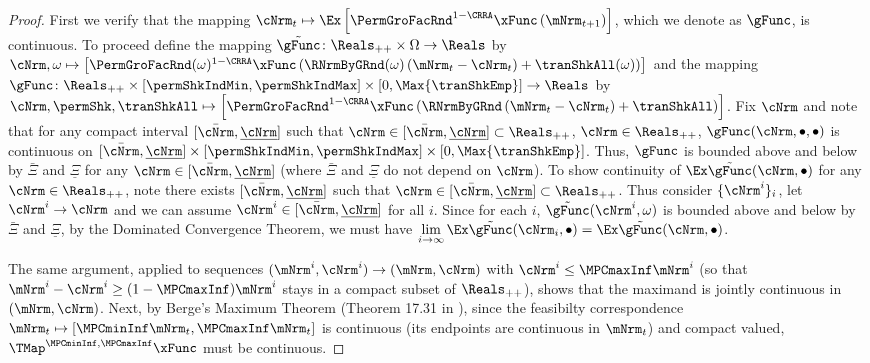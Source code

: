 \documentclass[\econtexRoot/BufferStockTheory]{subfiles}
\begin{document}
\begin{proof}
First we verify that the mapping $\cNrm_{t}\mapsto \Ex\left[ {\PermGroFacRnd}^{1-\CRRA }{\mathfrak{\xFunc}}
                                            \left( {\mNrm}_{t+1}\right) \right]$, which we denote as $\gFunc$,  is continuous.
To proceed define the mapping $\tilde{\gFunc}\colon \Reals_{++}\times\Omega\rightarrow \Reals$ by $\cNrm, \omega \mapsto\left[ {\PermGroFacRnd}(\omega)^{1-\CRRA }{\mathfrak{\xFunc}}
                                            \left( \RNrmByGRnd(\omega)\left(\mNrm_{t} - \cNrm_{t}\right) + \tranShkAll(\omega)\right) \right]$ and the mapping $\gFunc\colon \Reals_{++}\times[\permShkIndMin,\permShkIndMax]\times [0,\Max{\tranShkEmp}] \rightarrow \Reals$ by $\cNrm, \permShk,\tranShkAll \mapsto\left[ {\PermGroFacRnd}^{1-\CRRA }{\mathfrak{\xFunc}}
                                            \left( \RNrmByGRnd\left(\mNrm_{t} - \cNrm_{t}\right) + \tranShkAll\right) \right]$.
Fix $\cNrm$ and note that for any compact interval $[\bar{\cNrm},\underline{\cNrm}]$ such that $\cNrm\in [\bar{\cNrm},\underline{\cNrm}]\subset \Reals_{++}$, $\cNrm\in \Reals_{++}$, $\gFunc(\cNrm,\bullet,\bullet)$ is continuous on $[\bar{\cNrm},\underline{\cNrm}]\times[\permShkIndMin,\permShkIndMax]\times [0,\Max{\tranShkEmp}]$.
Thus, $\gFunc$ is bounded above and below by $\bar{\Xi}$ and $\underline{\Xi}$ for any $\cNrm\in [\bar{\cNrm},\underline{\cNrm}]$ (where $\bar{\Xi}$ and $\underline{\Xi}$ do not depend on $\cNrm$).
To show continuity of $\Ex \tilde{\gFunc}(\cNrm,\bullet)$ for any $\cNrm \in \Reals_{++}$, note there exists  $[\bar{\cNrm},\underline{\cNrm}]$ such that $\cNrm\in [\bar{\cNrm},\underline{\cNrm}]\subset \Reals_{++}$.
Thus consider $\{\cNrm^{i}\}_{i}$, let $\cNrm^{i}\rightarrow \cNrm$ and we can assume $\cNrm^{i}\in [\bar{\cNrm},\underline{\cNrm}]$ for all $i$.
Since for each $i$, $\tilde{\gFunc}(\cNrm^{i},\omega)$ is bounded above and below by $\bar{\Xi}$ and $\underline{\Xi}$, by the Dominated Convergence Theorem, we must have $\lim\limits_{i\rightarrow \infty}\Ex \tilde{\gFunc}(\cNrm_{i},\bullet) = \Ex \tilde{\gFunc}(\cNrm,\bullet)$.

                                            
The same argument, applied to sequences $(\mNrm^{i},\cNrm^{i})\rightarrow(\mNrm,\cNrm)$ with $\cNrm^{i}\leq\MPCmaxInf\mNrm^{i}$ (so that $\mNrm^{i}-\cNrm^{i}\geq(1-\MPCmaxInf)\mNrm^{i}$ stays in a compact subset of $\Reals_{++}$), shows that the maximand is jointly continuous in $(\mNrm,\cNrm)$.
Next, by Berge's Maximum Theorem (Theorem 17.31 in \cite{Aliprantis2005}), since the feasibilty correspondence $\mNrm_{t}\mapsto [\MPCminInf \mNrm_{t}, \MPCmaxInf \mNrm_{t}]$ is continuous (its endpoints are continuous in $\mNrm_{t}$) and compact valued, $\TMap^{\MPCminInf, \MPCmaxInf}{\mathfrak{\xFunc}}$ must be continuous.



\end{proof}
\end{document}
